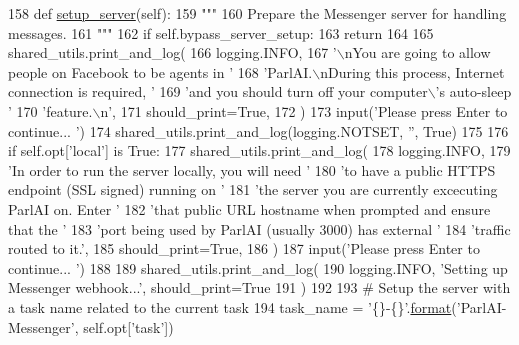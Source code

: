 \begin{DoxyCode}
158     \textcolor{keyword}{def }\hyperlink{namespaceparlai_1_1chat__service_1_1services_1_1messenger_1_1server__utils_afb56b04206cd0f42384438f1ac6d9cda}{setup\_server}(self):
159         \textcolor{stringliteral}{"""}
160 \textcolor{stringliteral}{        Prepare the Messenger server for handling messages.}
161 \textcolor{stringliteral}{        """}
162         \textcolor{keywordflow}{if} self.bypass\_server\_setup:
163             \textcolor{keywordflow}{return}
164 
165         shared\_utils.print\_and\_log(
166             logging.INFO,
167             \textcolor{stringliteral}{'\(\backslash\)nYou are going to allow people on Facebook to be agents in '}
168             \textcolor{stringliteral}{'ParlAI.\(\backslash\)nDuring this process, Internet connection is required, '}
169             \textcolor{stringliteral}{'and you should turn off your computer\(\backslash\)'s auto-sleep '}
170             \textcolor{stringliteral}{'feature.\(\backslash\)n'},
171             should\_print=\textcolor{keyword}{True},
172         )
173         input(\textcolor{stringliteral}{'Please press Enter to continue... '})
174         shared\_utils.print\_and\_log(logging.NOTSET, \textcolor{stringliteral}{''}, \textcolor{keyword}{True})
175 
176         \textcolor{keywordflow}{if} self.opt[\textcolor{stringliteral}{'local'}] \textcolor{keywordflow}{is} \textcolor{keyword}{True}:
177             shared\_utils.print\_and\_log(
178                 logging.INFO,
179                 \textcolor{stringliteral}{'In order to run the server locally, you will need '}
180                 \textcolor{stringliteral}{'to have a public HTTPS endpoint (SSL signed) running on '}
181                 \textcolor{stringliteral}{'the server you are currently excecuting ParlAI on. Enter '}
182                 \textcolor{stringliteral}{'that public URL hostname when prompted and ensure that the '}
183                 \textcolor{stringliteral}{'port being used by ParlAI (usually 3000) has external '}
184                 \textcolor{stringliteral}{'traffic routed to it.'},
185                 should\_print=\textcolor{keyword}{True},
186             )
187             input(\textcolor{stringliteral}{'Please press Enter to continue... '})
188 
189         shared\_utils.print\_and\_log(
190             logging.INFO, \textcolor{stringliteral}{'Setting up Messenger webhook...'}, should\_print=\textcolor{keyword}{True}
191         )
192 
193         \textcolor{comment}{# Setup the server with a task name related to the current task}
194         task\_name = \textcolor{stringliteral}{'\{\}-\{\}'}.\hyperlink{namespaceparlai_1_1chat__service_1_1services_1_1messenger_1_1shared__utils_a32e2e2022b824fbaf80c747160b52a76}{format}(\textcolor{stringliteral}{'ParlAI-Messenger'}, self.opt[\textcolor{stringliteral}{'task'}])

\end{DoxyCode}

